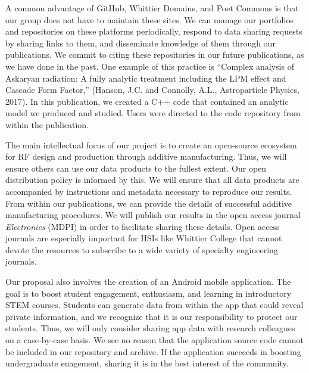 \documentclass[10pt]{amsart}
\theoremstyle{definition}
\numberwithin{equation}{section}
\begin{document}
A common advantage of GitHub, Whittier Domains, and Poet Commons is that our group does not have to maintain these sites.  We can manage our portfolios and repositories on these platforms periodically, respond to data sharing requests by sharing links to them, and disseminate knowledge of them through our publications.  We commit to citing these repositories in our future publications, as we have done in the past.  One example of this practice is ``Complex analysis of Askaryan radiation: A fully analytic treatment including the LPM effect and Cascade Form Factor,'' (Hanson, J.C. and Connolly, A.L., Astroparticle Physics, 2017).  In this publication, we created a C++ code that contained an analytic model we produced and studied.  Users were directed to the code repository from within the publication.  

The main intellectual focus of our project is to create an open-source ecosystem for RF design and production through additive manufacturing.  Thus, we will ensure others can use our data products to the fullest extent.  Our open distribution policy is informed by this.  We will ensure that all data products are accompanied by instructions and metadata necessary to reproduce our results.  From within our publications, we can provide the details of successful additive manufacturing procedures.  We will publish our results in the open access journal \textit{Electronics} (MDPI) in order to facilitate sharing these details.  Open access journals are especially important for HSIs like Whittier College that cannot devote the resources to subscribe to a wide variety of specialty engineering journals.  

Our proposal also involves the creation of an Android mobile application.  The goal is to boost student engagement, enthusiasm, and learning in introductory STEM courses.  Students can generate data from within the app that could reveal private information, and we recognize that it is our responsibility to protect our students.  Thus, we will only consider sharing app data with research colleagues on a case-by-case basis.  We see no reason that the application source code cannot be included in our repository and archive.  If the application succeeds in boosting undergraduate enagement, sharing it is in the best interest of the community.




\end{document}
